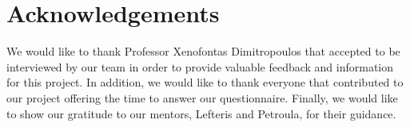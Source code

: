 \section*{Acknowledgements}

We would like to thank Professor Xenofontas Dimitropoulos that accepted to be 
interviewed by our team in order to provide valuable feedback and information 
for this project. 
In addition, we would like to thank everyone that contributed to our project 
offering the time to answer our questionnaire.
Finally, we would like to show our gratitude to our mentors, Lefteris and 
Petroula, for their guidance. 

